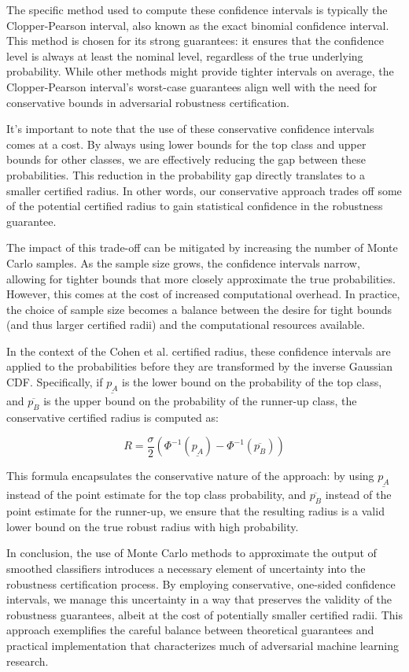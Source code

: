 The specific method used to compute these confidence intervals is typically the Clopper-Pearson interval, also known as the exact binomial confidence interval.
This method is chosen for its strong guarantees: it ensures that the confidence level is always at least the nominal level, regardless of the true underlying probability.
While other methods might provide tighter intervals on average, the Clopper-Pearson interval's worst-case guarantees align well with the need for conservative bounds in adversarial robustness certification.

It's important to note that the use of these conservative confidence intervals comes at a cost.
By always using lower bounds for the top class and upper bounds for other classes, we are effectively reducing the gap between these probabilities.
This reduction in the probability gap directly translates to a smaller certified radius.
In other words, our conservative approach trades off some of the potential certified radius to gain statistical confidence in the robustness guarantee.

The impact of this trade-off can be mitigated by increasing the number of Monte Carlo samples.
As the sample size grows, the confidence intervals narrow, allowing for tighter bounds that more closely approximate the true probabilities.
However, this comes at the cost of increased computational overhead.
In practice, the choice of sample size becomes a balance between the desire for tight bounds (and thus larger certified radii) and the computational resources available.


In the context of the Cohen et al.
certified radius, these confidence intervals are applied to the probabilities before they are transformed by the inverse Gaussian CDF. Specifically, if $\underline{p_A}$ is the lower bound on the probability of the top class, and $\overline{p_B}$ is the upper bound on the probability of the runner-up class, the conservative certified radius is computed as:

\[
    R = \frac{\sigma}{2}(\Phi^{-1}(\underline{p_A}) - \Phi^{-1}(\overline{p_B}))
\]

This formula encapsulates the conservative nature of the approach: by using $\underline{p_A}$ instead of the point estimate for the top class probability, and $\overline{p_B}$ instead of the point estimate for the runner-up, we ensure that the resulting radius is a valid lower bound on the true robust radius with high probability.

In conclusion, the use of Monte Carlo methods to approximate the output of smoothed classifiers introduces a necessary element of uncertainty into the robustness certification process.
By employing conservative, one-sided confidence intervals, we manage this uncertainty in a way that preserves the validity of the robustness guarantees, albeit at the cost of potentially smaller certified radii.
This approach exemplifies the careful balance between theoretical guarantees and practical implementation that characterizes much of adversarial machine learning research.


